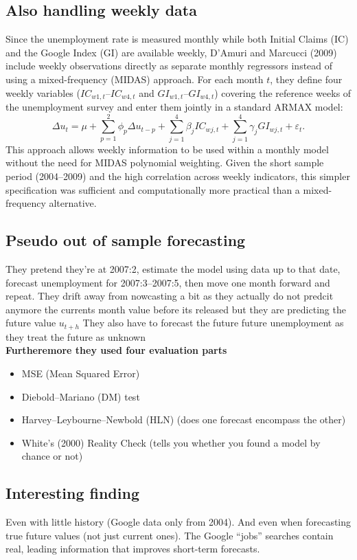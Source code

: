 \documentclass{article}
\begin{document}
\subsection{Also handling weekly data}
Since the unemployment rate is measured monthly while both Initial Claims (IC)
and the Google Index (GI) are available weekly, D'Amuri and Marcucci (2009)
include weekly observations directly as separate monthly regressors instead of
using a mixed-frequency (MIDAS) approach. For each month $t$, they define
four weekly variables ($IC_{w1,t}$--$IC_{w4,t}$ and $GI_{w1,t}$--$GI_{w4,t}$)
covering the reference weeks of the unemployment survey and enter them
jointly in a standard ARMAX model:
\[
\Delta u_t = \mu + \sum_{p=1}^{2} \phi_p \Delta u_{t-p}
+ \sum_{j=1}^{4} \beta_j IC_{w j,t}
+ \sum_{j=1}^{4} \gamma_j GI_{w j,t}
+ \varepsilon_t .
\]
This approach allows weekly information to be used within a monthly model
without the need for MIDAS polynomial weighting. Given the short sample
period (2004--2009) and the high correlation across weekly indicators, this
simpler specification was sufficient and computationally more practical
than a mixed-frequency alternative.

\subsection{Pseudo out of sample forecasting}
They pretend they’re at 2007:2, estimate the model using data up to that date, forecast unemployment for 2007:3–2007:5, then move one month forward and repeat.
They drift away from nowcasting a bit as they actually do not predcit anymore the currents month value before its released but they are predicting the future value $u_{t+h}$
They also have to forecast the future future unemployment as they treat the future as unknown
\\
\textbf{Furtheremore they used four evaluation parts}
\begin{itemize}
    \item MSE (Mean Squared Error)
    \item Diebold–Mariano (DM) test
    \item Harvey–Leybourne–Newbold (HLN) (does one forecast encompass the other)
    \item White’s (2000) Reality Check (tells you whether you found a model by chance or not)
\end{itemize}

\subsection{Interesting finding}
Even with little history (Google data only from 2004). And even when forecasting true future values (not just current ones). The Google “jobs” searches contain real, leading information that improves short-term forecasts.
\end{document}
